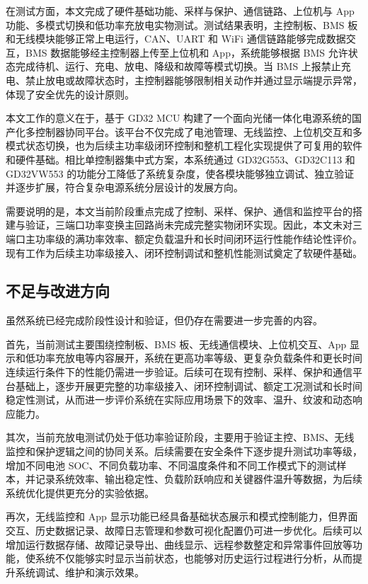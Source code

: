 在测试方面，本文完成了硬件基础功能、采样与保护、通信链路、上位机与 App 功能、多模式切换和低功率充放电实物测试。测试结果表明，主控制板、BMS 板和无线模块能够正常上电运行，CAN、UART 和 WiFi 通信链路能够完成数据交互，BMS 数据能够经主控制器上传至上位机和 App，系统能够根据 BMS 允许状态完成待机、运行、充电、放电、降级和故障等模式切换。当 BMS 上报禁止充电、禁止放电或故障状态时，主控制器能够限制相关动作并通过显示端提示异常，体现了安全优先的设计原则。

本文工作的意义在于，基于 GD32 MCU 构建了一个面向光储一体化电源系统的国产化多控制器协同平台。该平台不仅完成了电池管理、无线监控、上位机交互和多模式状态切换，也为后续主功率级闭环控制和整机工程化实现提供了可复用的软件和硬件基础。相比单控制器集中式方案，本系统通过 GD32G553、GD32C113 和 GD32VW553 的功能分工降低了系统复杂度，使各模块能够独立调试、独立验证并逐步扩展，符合复杂电源系统分层设计的发展方向。

需要说明的是，本文当前阶段重点完成了控制、采样、保护、通信和监控平台的搭建与验证，三端口功率变换主回路尚未完成完整实物闭环实现。因此，本文未对三端口主功率级的满功率效率、额定负载温升和长时间闭环运行性能作结论性评价。现有工作为后续主功率级接入、闭环控制调试和整机性能测试奠定了软硬件基础。

\subsection{不足与改进方向}

虽然系统已经完成阶段性设计和验证，但仍存在需要进一步完善的内容。

首先，当前测试主要围绕控制板、BMS 板、无线通信模块、上位机交互、App 显示和低功率充放电等内容展开，系统在更高功率等级、更复杂负载条件和更长时间连续运行条件下的性能仍需进一步验证。后续可在现有控制、采样、保护和通信平台基础上，逐步开展更完整的功率级接入、闭环控制调试、额定工况测试和长时间稳定性测试，从而进一步评价系统在实际应用场景下的效率、温升、纹波和动态响应能力。

其次，当前充放电测试仍处于低功率验证阶段，主要用于验证主控、BMS、无线监控和保护逻辑之间的协同关系。后续需要在安全条件下逐步提升测试功率等级，增加不同电池 SOC、不同负载功率、不同温度条件和不同工作模式下的测试样本，并记录系统效率、输出稳定性、负载阶跃响应和关键器件温升等数据，为后续系统优化提供更充分的实验依据。

再次，无线监控和 App 显示功能已经具备基础状态展示和模式控制能力，但界面交互、历史数据记录、故障日志管理和参数可视化配置仍可进一步优化。后续可以增加运行数据存储、故障记录导出、曲线显示、远程参数整定和异常事件回放等功能，使系统不仅能够实时显示当前状态，也能够对历史运行过程进行分析，从而提升系统调试、维护和演示效果。


